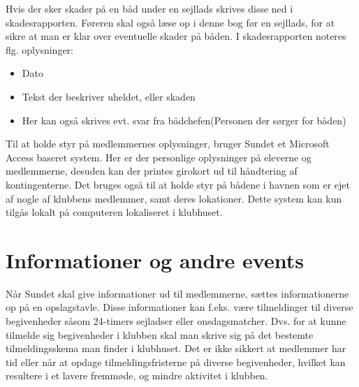 Hvis der sker skader på en båd under en sejllads skrives disse ned i skadesrapporten. 
Føreren skal også læse op i denne bog før en sejllads, for at sikre at man er klar over eventuelle skader på båden.
I skadesrapporten noteres flg. oplysninger:

\begin{itemize}
	\item Dato
	\item Tekst der beskriver uheldet, eller skaden
	\item Her kan også skrives evt. svar fra bådchefen(Personen der sørger for båden)
\end{itemize}

Til at holde styr på medlemmernes oplysninger, bruger Sundet et Microsoft Access baseret system. Her er der personlige oplysninger på eleverne og medlemmerne, desuden kan der printes girokort ud til håndtering af kontingenterne. Det bruges også til at holde styr på bådene i havnen som er ejet af nogle af klubbens medlemmer, samt deres lokationer. Dette system kan kun tilgås lokalt på computeren lokaliseret i klubhuset.

\section{Informationer og andre events}

Når Sundet skal give informationer ud til medlemmerne, sættes informationerne op på en opslagstavle.
Disse informationer kan f.eks. være tilmeldinger til diverse begivenheder såsom 24-timers sejladser eller onsdagsmatcher. 
Dvs. for at kunne tilmelde sig begivenheder i klubben skal man skrive sig på det bestemte tilmeldingsskema man finder i klubhuset. 
Det er ikke sikkert at medlemmer har tid eller når at opdage tilmeldingsfristerne på diverse begivenheder, hvilket kan resultere i et lavere fremmøde, og mindre aktivitet i klubben.
